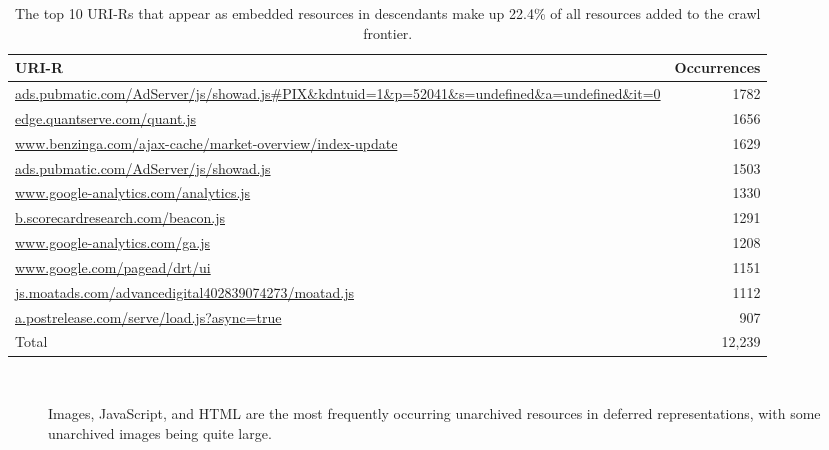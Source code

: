 \documentclass{sig-alternate}
\begin{document}



\begin{table}
\centering
\begin{tabular}{ p{5cm} | r}
\textbf{URI-R} & \textbf{Occurrences} \\
\hline
\hline
\url{ads.pubmatic.com/AdServer/js/showad.js#PIX&kdntuid=1&p=52041&s=undefined&a=undefined&it=0} & 1782 \\
\hline
\url{edge.quantserve.com/quant.js} & 1656 \\
\hline
\url{www.benzinga.com/ajax-cache/market-overview/index-update} & 1629 \\
\hline
\url{ads.pubmatic.com/AdServer/js/showad.js} & 1503 \\
\hline
\url{www.google-analytics.com/analytics.js} & 1330 \\
\hline
\url{b.scorecardresearch.com/beacon.js} & 1291 \\
\hline
\url{www.google-analytics.com/ga.js} & 1208 \\
\hline
\url{www.google.com/pagead/drt/ui} & 1151 \\
\hline
\url{js.moatads.com/advancedigital402839074273/moatad.js} & 1112 \\
\hline
\url{a.postrelease.com/serve/load.js?async=true} &  907\\
\hline
\hline
Total &  12,239\\
\hline
\end{tabular}
  \caption{The top 10 URI-Rs that appear as embedded resources in descendants make up 22.4\% of all resources added to the crawl frontier. }
  \label{counts}
\end{table}

\begin{figure}
  \begin{center}
    \\
  \end{center}
  \caption{Images, JavaScript, and HTML are the most frequently occurring unarchived resources in deferred representations, with some unarchived images being quite large.}
  \label{mimeFigs}
\end{figure}
\end{document}
